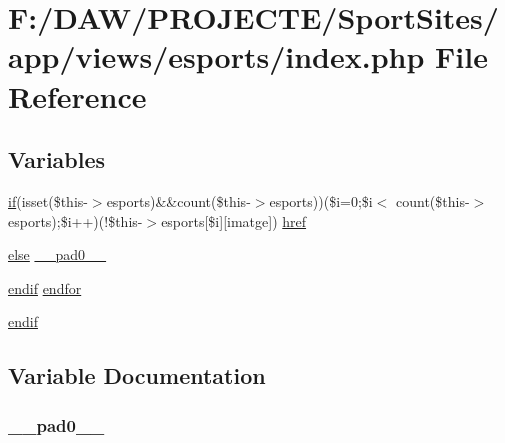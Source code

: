 \hypertarget{app_2views_2esports_2index_8php}{}\section{F\+:/\+D\+A\+W/\+P\+R\+O\+J\+E\+C\+T\+E/\+Sport\+Sites/app/views/esports/index.php File Reference}
\label{app_2views_2esports_2index_8php}
\subsection*{Variables}
\begin{DoxyCompactItemize}
\item 
\hyperlink{app_2views_2index_2index_8php_af71ebd4d252438a1590e85e150ce8954}{if}(isset(\$this-\/$>$esports)\&\&count(\$this-\/$>$esports))(\$i=0;\$i$<$ count(\$this-\/$>$esports);\$i++)(!\$this-\/$>$esports\mbox{[}\$i\mbox{]}\mbox{[}\textquotesingle{}imatge\textquotesingle{}\mbox{]}) \hyperlink{app_2views_2esports_2index_8php_aecfca4286e302d5d945be6fe76b99c86}{href}
\item 
\hyperlink{header_8php_ae69d798cba64778886b1a564b11f2793}{else} \hyperlink{app_2views_2esports_2index_8php_a8e01dcc96c43199448ee66f7c2ae8ea6}{\+\_\+\+\_\+pad0\+\_\+\+\_\+}
\item 
\hyperlink{header_8php_a2f576def868d9b1e442c2042a246de2a}{endif} \hyperlink{app_2views_2esports_2index_8php_a3653f8507506e779e39b8b3cd0dde430}{endfor}
\item 
\hyperlink{app_2views_2esports_2index_8php_a82cd33ca97ff99f2fcc5e9c81d65251b}{endif}
\end{DoxyCompactItemize}


\subsection{Variable Documentation}
\hypertarget{app_2views_2esports_2index_8php_a8e01dcc96c43199448ee66f7c2ae8ea6}{}
\subsubsection[{\+\_\+\+\_\+pad0\+\_\+\+\_\+}]{ \+\_\+\+\_\+pad0\+\_\+\+\_\+}\label{app_2views_2esports_2index_8php_a8e01dcc96c43199448ee66f7c2ae8ea6}
\hypertarget{app_2views_2esports_2index_8php_a3653f8507506e779e39b8b3cd0dde430}{}
